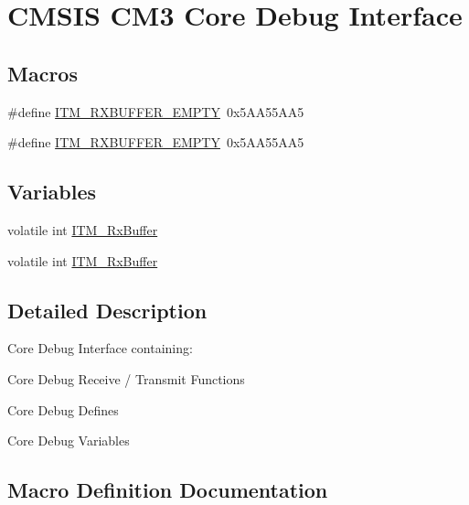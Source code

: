 \hypertarget{group___c_m_s_i_s___c_m3___core_debug_interface}{}\section{C\+M\+S\+IS C\+M3 Core Debug Interface}
\label{group___c_m_s_i_s___c_m3___core_debug_interface}
\subsection*{Macros}
\begin{DoxyCompactItemize}
\item 
\#define \hyperlink{group___c_m_s_i_s___c_m3___core_debug_interface_gaa822cb398ee022b59e9e6c5d7bbb228a}{I\+T\+M\+\_\+\+R\+X\+B\+U\+F\+F\+E\+R\+\_\+\+E\+M\+P\+TY}~0x5\+A\+A55\+A\+A5
\item 
\#define \hyperlink{group___c_m_s_i_s___c_m3___core_debug_interface_gaa822cb398ee022b59e9e6c5d7bbb228a}{I\+T\+M\+\_\+\+R\+X\+B\+U\+F\+F\+E\+R\+\_\+\+E\+M\+P\+TY}~0x5\+A\+A55\+A\+A5
\end{DoxyCompactItemize}
\subsection*{Variables}
\begin{DoxyCompactItemize}
\item 
volatile int \hyperlink{group___c_m_s_i_s___c_m3___core_debug_interface_gacf1fe3063cedf11b6e6f7cb0dd7c1a51}{I\+T\+M\+\_\+\+Rx\+Buffer}
\item 
volatile int \hyperlink{group___c_m_s_i_s___c_m3___core_debug_interface_gacf1fe3063cedf11b6e6f7cb0dd7c1a51}{I\+T\+M\+\_\+\+Rx\+Buffer}
\end{DoxyCompactItemize}


\subsection{Detailed Description}
Core Debug Interface containing\+:
\begin{DoxyItemize}
\item Core Debug Receive / Transmit Functions
\item Core Debug Defines
\item Core Debug Variables 
\end{DoxyItemize}

\subsection{Macro Definition Documentation}
